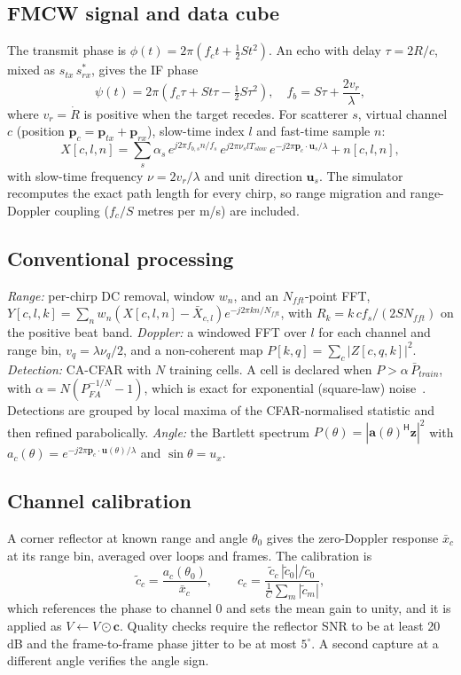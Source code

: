 \documentclass[conference]{IEEEtran}
\newcommand{\vect}[1]{\mathbf{#1}}
\newcommand{\Hm}{^{\mathsf H}}
\begin{document}
\subsection{FMCW signal and data cube}
The transmit phase is $\phi(t)=2\pi(f_c t+\tfrac12 S t^2)$. An echo with delay
$\tau=2R/c$, mixed as $s_{tx}\,s_{rx}^{*}$, gives the IF phase
\begin{equation}
\psi(t)=2\pi\left(f_c\tau+S t\tau-\tfrac12 S\tau^2\right),\quad f_b=S\tau+\frac{2v_r}{\lambda},
\end{equation}
where $v_r=\dot R$ is positive when the target recedes. For scatterer $s$, virtual channel $c$
(position $\vect p_c=\vect p_{tx}+\vect p_{rx}$), slow-time index $l$ and fast-time sample $n$:
\begin{equation}
X[c,l,n]=\sum_s \alpha_s\, e^{j2\pi f_{b,s} n/f_s}\, e^{j2\pi\nu_s l T_{slow}}\,
e^{-j2\pi\vect p_c\cdot\vect u_s/\lambda}+n[c,l,n],
\end{equation}
with slow-time frequency $\nu=2v_r/\lambda$ and unit direction $\vect u_s$. The simulator
recomputes the exact path length for every chirp, so range migration and range-Doppler coupling
($f_c/S$ metres per m/s) are included.

\subsection{Conventional processing}
\emph{Range:} per-chirp DC removal, window $w_n$, and an $N_{fft}$-point FFT,
$Y[c,l,k]=\sum_n w_n(X[c,l,n]-\bar X_{c,l})e^{-j2\pi kn/N_{fft}}$, with
$R_k=k\,c f_s/(2SN_{fft})$ on the positive beat band.
\emph{Doppler:} a windowed FFT over $l$ for each channel and range bin, $v_q=\lambda\nu_q/2$,
and a non-coherent map $P[k,q]=\sum_c|Z[c,q,k]|^2$.
\emph{Detection:} CA-CFAR with $N$ training cells. A cell is declared when
$P>\alpha\,\bar P_{train}$, with $\alpha=N(P_{FA}^{-1/N}-1)$, which is exact for exponential
(square-law) noise~\cite{finn1968,richards2014}. Detections are grouped by local maxima of the
CFAR-normalised statistic and then refined parabolically.
\emph{Angle:} the Bartlett spectrum $P(\theta)=|\vect a(\theta)\Hm\vect z|^2$ with
$a_c(\theta)=e^{-j2\pi\vect p_c\cdot\vect u(\theta)/\lambda}$ and $\sin\theta=u_x$.

\subsection{Channel calibration}
A corner reflector at known range and angle $\theta_0$ gives the zero-Doppler response
$\bar x_c$ at its range bin, averaged over loops and frames. The calibration is
\begin{equation}
\tilde c_c=\frac{a_c(\theta_0)}{\bar x_c},\qquad
c_c=\frac{\tilde c_c\,|\tilde c_0|/\tilde c_0}{\frac1C\sum_m|\tilde c_m|},
\end{equation}
which references the phase to channel 0 and sets the mean gain to unity, and it is applied as
$V\leftarrow V\odot\vect c$. Quality checks require the reflector SNR to be at least 20\,dB and
the frame-to-frame phase jitter to be at most $5^\circ$. A second capture at a different angle
verifies the angle sign.
\end{document}
